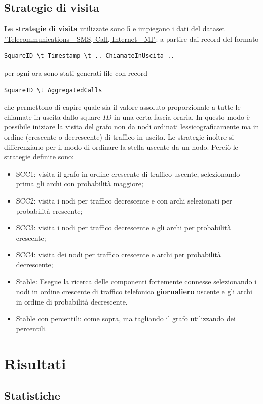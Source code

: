 \documentclass[10pt,a4paper]{article}
\begin{document}
\subsection{Strategie di visita}
\textbf{Le strategie di visita} utilizzate sono 5 e impiegano i dati del dataset 
\href{https://dandelion.eu/datagem/telecom-sms-call-internet-mi/description/}{"Telecommunications - SMS, Call, Internet - MI"}:
a partire dai record del formato
\begin{verbatim}
SquareID \t Timestamp \t .. ChiamateInUscita ..
\end{verbatim}
per ogni ora sono stati generati file con record
\begin{verbatim}
SquareID \t AggregatedCalls
\end{verbatim}
che permettono di capire quale sia il valore assoluto proporzionale a tutte le chiamate in uscita dallo square
$ID$ in una certa fascia oraria.
In questo modo è possibile iniziare la visita del grafo non da nodi ordinati lessicograficamente ma in ordine
(crescente o decrescente) di traffico in uscita.
Le strategie inoltre si differenziano per il modo di ordinare la stella uscente da un nodo.
Perciò le strategie definite sono:
\begin{itemize}
\item SCC1: visita il grafo in ordine crescente di traffico uscente,
selezionando prima gli archi con probabilità maggiore;
\item SCC2: visita i nodi per traffico decrescente e con archi selezionati per probabilità crescente;
\item SCC3: visita i nodi per traffico decrescente e gli archi per probabilità crescente;
\item SCC4: visita dei nodi per traffico crescente e archi per probabilità decrescente;
\item Stable: Esegue la ricerca delle componenti fortemente connesse selezionando i nodi in ordine crescente di traffico telefonico \textbf{giornaliero} uscente e gli archi in ordine di probabilità decrescente.
\item Stable con percentili: come sopra, ma tagliando il grafo utilizzando dei percentili.
\end{itemize}
 
\section{Risultati}

\subsection{Statistiche}
\end{document}
